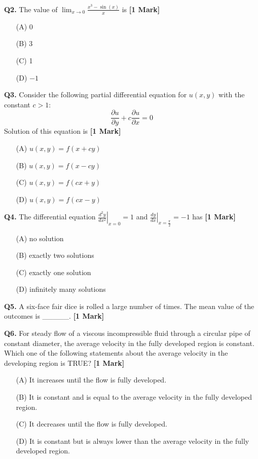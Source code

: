 \documentclass[11pt]{article}
\newcommand{\questiona}[2]{
    \noindent\textbf{Q#2.} #1 \hfill \textbf{[1 Mark]}
}
\begin{document}
\questiona{The value of \(\lim_{x \to 0} \frac{x^3 - \sin(x)}{x}\) is}{2}
\begin{enumerate}
    \item[(A)] 0  
    \item[(B)] 3  
    \item[(C)] 1  
    \item[(D)] \(-1\)
\end{enumerate}
\vspace{0.5cm}

\questiona{Consider the following partial differential equation for \( u(x, y) \) with the constant \( c > 1 \):  
\[\frac{\partial u}{\partial y} + c \frac{\partial u}{\partial x} = 0\]  
Solution of this equation is}{3}
\begin{enumerate}
    \item[(A)] \( u(x, y) = f(x + cy) \)  
    \item[(B)] \( u(x, y) = f(x - cy) \)  
    \item[(C)] \( u(x, y) = f(cx + y) \)  
    \item[(D)] \( u(x, y) = f(cx - y) \)
\end{enumerate}
\vspace{0.5cm}

\questiona{The differential equation \(\left. \frac{d^2y}{dx^2} \right|_{x=0} = 1\) and \(\left. \frac{dy}{dx} \right|_{x=\frac{\pi}{2}} = -1\) has}{4}
\begin{enumerate}
    \item[(A)] no solution  
    \item[(B)] exactly two solutions  
    \item[(C)] exactly one solution  
    \item[(D)] infinitely many solutions
\end{enumerate}
\vspace{0.5cm}

\questiona{A six-face fair dice is rolled a large number of times. The mean value of the outcomes is \_\_\_\_\_.}{5}
\vspace{0.5cm}

\questiona{For steady flow of a viscous incompressible fluid through a circular pipe of constant diameter, the average velocity in the fully developed region is constant. Which one of the following statements about the average velocity in the developing region is TRUE?}{6}
\begin{enumerate}
    \item[(A)] It increases until the flow is fully developed.
    \item[(B)] It is constant and is equal to the average velocity in the fully developed region.
    \item[(C)] It decreases until the flow is fully developed.
    \item[(D)] It is constant but is always lower than the average velocity in the fully developed region.
\end{enumerate}
\vspace{0.5cm}
\end{document}
